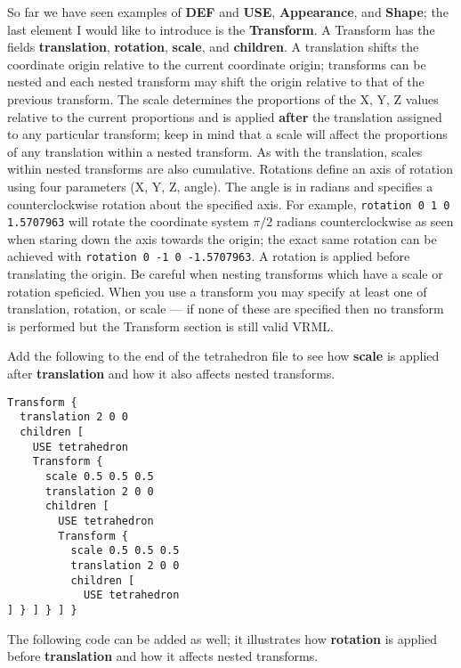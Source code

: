\documentclass[a4paper, dvipdfm]{article}
\begin{document}
So far we have seen examples of \textbf{DEF} and \textbf{USE}, \textbf{Appearance}, and \textbf{Shape};
the last element I would like to introduce is the \textbf{Transform}. A Transform has the fields
\textbf{translation}, \textbf{rotation}, \textbf{scale}, and \textbf{children}.  A translation shifts
the coordinate origin relative to the current coordinate origin; transforms can be nested and each
nested transform may shift the origin relative to that of the previous transform.  The scale determines
the proportions of the X, Y, Z values relative to the current proportions and is applied \textbf{after}
the translation assigned to any particular transform; keep in mind that a scale will affect the
proportions of any translation within a nested transform. As with the translation, scales within nested
transforms are also cumulative. Rotations
define an axis of rotation using four parameters (X, Y, Z, angle). The angle is in radians and specifies
a counterclockwise rotation about the specified axis. For example, \verb~rotation 0 1 0 1.5707963~ will
rotate the coordinate system $\pi/2$ radians counterclockwise as seen when staring down the axis towards
the origin; the exact same rotation can be achieved with \verb~rotation 0 -1 0 -1.5707963~. 
A rotation is applied before translating the origin. Be careful when nesting transforms which have
a scale or rotation speficied.  When you use a transform you may specify at least one of translation,
rotation, or scale --- if none of these are specified then no transform is performed but the Transform
section is still valid VRML.

Add the following to the end of the tetrahedron file to see how \textbf{scale} is applied after \textbf{translation}
and how it also affects nested transforms.

\begin{verbatim}
Transform {
  translation 2 0 0
  children [
    USE tetrahedron
    Transform {
      scale 0.5 0.5 0.5
      translation 2 0 0
      children [
        USE tetrahedron
        Transform {
          scale 0.5 0.5 0.5
          translation 2 0 0
          children [
            USE tetrahedron
] } ] } ] }
\end{verbatim}

The following code can be added as well; it illustrates how \textbf{rotation} is applied before \textbf{translation}
and how it affects nested transforms.
\end{document}
